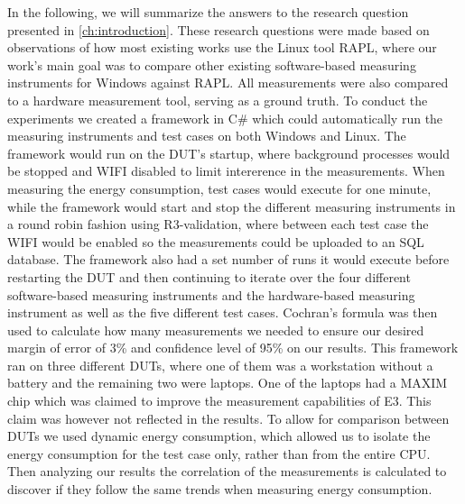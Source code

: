 In the following, we will summarize the answers to the research question presented in \cref{ch:introduction}. These research questions were made based on observations of how most existing works use the Linux tool RAPL, where our work's main goal was to compare other existing software-based measuring instruments for Windows against RAPL. All measurements were also compared to a hardware measurement tool, serving as a ground truth. To conduct the experiments we created a framework in C\# which could automatically run the measuring instruments and test cases on both Windows and Linux. The framework would run on the DUT's startup, where background processes would be stopped and WIFI disabled to limit intererence in the measurements. When measuring the energy consumption, test cases would execute for one minute, while the framework would start and stop the different measuring instruments in a round robin fashion using R3-validation, where between each test case the WIFI would be enabled so the measurements could be uploaded to an SQL database. The framework also had a set number of runs it would execute before restarting the DUT and then continuing to iterate over the four different software-based measuring instruments and the hardware-based measuring instrument as well as the five different test cases. Cochran's formula was then used to calculate how many measurements we needed to ensure our desired margin of error of 3\% and confidence level of 95\% on our results. This framework ran on three different DUTs, where one of them was a workstation without a battery and the remaining two were laptops. One of the laptops had a MAXIM chip which was claimed to improve the measurement capabilities of E3. This claim was however not reflected in the results. To allow for comparison between DUTs we used dynamic energy consumption, which allowed us to isolate the energy consumption for the test case only, rather than from the entire CPU. Then analyzing our results the correlation of the measurements is calculated to discover if they follow the same trends when measuring energy consumption.





